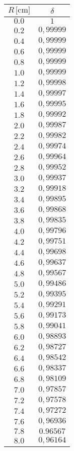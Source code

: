 \documentclass[]{article}
\begin{document}
\begin{table}
    \centering

\begin{tabular}{||c|c||}
    \hline
    $R \, \text{[cm]} $ & $ \delta $\\
    \hline\hline



    $0.0$ & $1$ \\\hline
    $0.2$ & $0,99999$ \\\hline
    $0.4$ & $0,99999$ \\\hline
    $0.6$ & $0,99999$ \\\hline
    $0.8$ & $0,99999$ \\\hline
    $1.0$ & $0,99999$ \\\hline
    $1.2$ & $0,99998$ \\\hline
    $1.4$ & $0,99997$ \\\hline
    $1.6$ & $0,99995$ \\\hline
    $1.8$ & $0,99992$ \\\hline
    $2.0$ & $0,99987$ \\\hline
    $2.2$ & $0,99982$ \\\hline
    $2.4$ & $0,99974$ \\\hline
    $2.6$ & $0,99964$ \\\hline
    $2.8$ & $0,99952$ \\\hline
    $3.0$ & $0,99937$ \\\hline
    $3.2$ & $0,99918$ \\\hline
    $3.4$ & $0,99895$ \\\hline
    $3.6$ & $0,99868$ \\\hline
    $3.8$ & $0,99835$ \\\hline
    $4.0$ & $0,99796$ \\\hline
    $4.2$ & $0,99751$ \\\hline
    $4.4$ & $0,99698$ \\\hline
    $4.6$ & $0,99637$ \\\hline
    $4.8$ & $0,99567$ \\\hline
    $5.0$ & $0,99486$ \\\hline
    $5.2$ & $0,99395$ \\\hline
    $5.4$ & $0,99291$ \\\hline
    $5.6$ & $0,99173$ \\\hline
    $5.8$ & $0,99041$ \\\hline
    $6.0$ & $0,98893$ \\\hline
    $6.2$ & $0,98727$ \\\hline
    $6.4$ & $0,98542$ \\\hline
    $6.6$ & $0,98337$ \\\hline
    $6.8$ & $0,98109$ \\\hline
    $7.0$ & $0,97857$ \\\hline
    $7.2$ & $0,97578$ \\\hline
    $7.4$ & $0,97272$ \\\hline
    $7.6$ & $0,96936$ \\\hline
    $7.8$ & $0.96567$ \\\hline
    $8.0$ & $0,96164$ \\\hline


\end{tabular}
\end{table}
\end{document}
